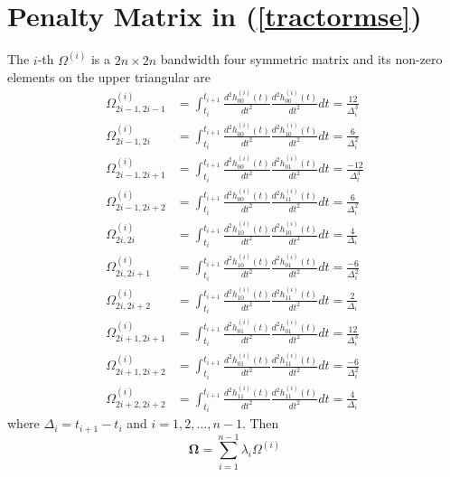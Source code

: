


\section{Penalty Matrix in (\ref{tractormse})}\label{PenaltyTermDetails}

The $i$-th $\Omega^{(i)}$ is a $2n \times 2n$ bandwidth four symmetric matrix and its non-zero elements on the upper triangular are 
\begin{align}
\Omega_{2i-1,2i-1}^{(i)} & =\int_{t_{i}}^{t_{i+1}} \frac{d^2 h_{00}^{(i)}(t)}{dt^2}  \frac{d^2 h_{00}^{(i)}(t)}{dt^2} dt=\frac{12}{\Delta_i^3}\\
\Omega_{2i-1,2i}^{(i)} &=\int_{t_{i}}^{t_{i+1}} \frac{d^2 h_{00}^{(i)}(t)}{dt^2}  \frac{d^2 h_{10}^{(i)}(t)}{dt^2} dt=\frac{6}{\Delta_i^2}\\
\Omega_{2i-1,2i+1}^{(i)} &=\int_{t_{i}}^{t_{i+1}} \frac{d^2 h_{00}^{(i)}(t)}{dt^2}  \frac{d^2 h_{01}^{(i)}(t)}{dt^2} dt=\frac{-12}{\Delta_i^3}\\
\Omega_{2i-1,2i+2}^{(i)} &=\int_{t_{i}}^{t_{i+1}} \frac{d^2 h_{00}^{(i)}(t)}{dt^2}  \frac{d^2 h_{11}^{(i)}(t)}{dt^2} dt=\frac{6}{\Delta_i^2}\\
\Omega_{2i,2i}^{(i)} &=\int_{t_{i}}^{t_{i+1}} \frac{d^2 h_{10}^{(i)}(t)}{dt^2}  \frac{d^2 h_{10}^{(i)}(t)}{dt^2} dt=\frac{4}{\Delta_i} \\
\Omega_{2i,2i+1}^{(i)} &=\int_{t_{i}}^{t_{i+1}} \frac{d^2 h_{10}^{(i)}(t)}{dt^2}  \frac{d^2 h_{01}^{(i)}(t)}{dt^2} dt=\frac{-6}{\Delta_i^2}\\
\Omega_{2i,2i+2}^{(i)} &=\int_{t_{i}}^{t_{i+1}} \frac{d^2 h_{10}^{(i)}(t)}{dt^2}  \frac{d^2 h_{11}^{(i)}(t)}{dt^2} dt=\frac{2}{\Delta_i}\\
\Omega_{2i+1,2i+1}^{(i)} &=\int_{t_{i}}^{t_{i+1}} \frac{d^2 h_{01}^{(i)}(t)}{dt^2}  \frac{d^2 h_{01}^{(i)}(t)}{dt^2} dt=\frac{12}{\Delta_i^3}\\
\Omega_{2i+1,2i+2}^{(i)} &=\int_{t_{i}}^{t_{i+1}} \frac{d^2 h_{01}^{(i)}(t)}{dt^2}  \frac{d^2 h_{11}^{(i)}(t)}{dt^2} dt=\frac{-6}{\Delta_i^2}\\
\Omega_{2i+2,2i+2}^{(i)} &=\int_{t_{i}}^{t_{i+1}} \frac{d^2 h_{11}^{(i)}(t)}{dt^2}  \frac{d^2 h_{11}^{(i)}(t)}{dt^2} dt=\frac{4}{\Delta_i}
\end{align}
where $\Delta_i=t_{i+1}-t_i$ and $i=1,2,\ldots,n-1$. Then 
\begin{equation*}
\mathbf{\Omega}=\sum_{i=1}^{n-1}\lambda_i\Omega^{(i)}
\end{equation*}


